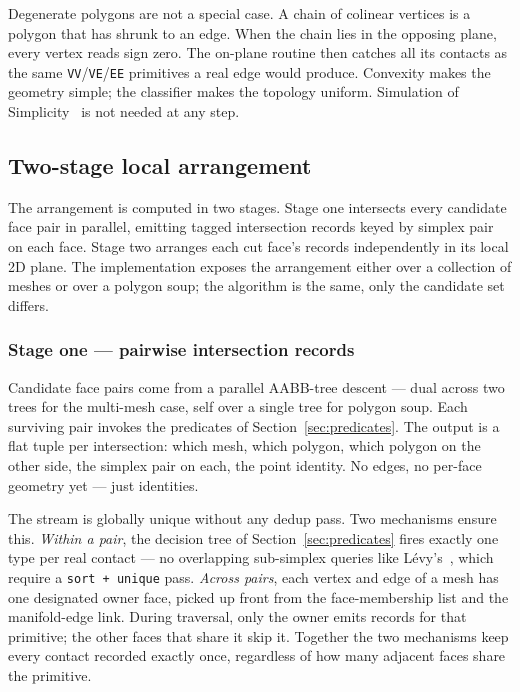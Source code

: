 \documentclass{egpubl}
\begin{document}
Degenerate polygons are not a special case. A chain of colinear vertices is a polygon that has shrunk to an edge. When the chain lies in the opposing plane, every vertex reads sign zero. The on-plane routine then catches all its contacts as the same \texttt{VV}/\texttt{VE}/\texttt{EE} primitives a real edge would produce. Convexity makes the geometry simple; the classifier makes the topology uniform. Simulation of Simplicity~\cite{EdelsbrunnerMucke1990} is not needed at any step.

\subsection{Two-stage local arrangement}
\label{sec:arrangement}

The arrangement is computed in two stages. Stage one intersects every candidate face pair in parallel, emitting tagged intersection records keyed by simplex pair on each face. Stage two arranges each cut face's records independently in its local 2D plane. The implementation exposes the arrangement either over a collection of meshes or over a polygon soup; the algorithm is the same, only the candidate set differs.

\subsubsection*{Stage one --- pairwise intersection records}

Candidate face pairs come from a parallel AABB-tree descent --- dual across two trees for the multi-mesh case, self over a single tree for polygon soup. Each surviving pair invokes the predicates of Section~\ref{sec:predicates}. The output is a flat tuple per intersection: which mesh, which polygon, which polygon on the other side, the simplex pair on each, the point identity. No edges, no per-face geometry yet --- just identities.

The stream is globally unique without any dedup pass. Two mechanisms ensure this. \emph{Within a pair}, the decision tree of Section~\ref{sec:predicates} fires exactly one type per real contact --- no overlapping sub-simplex queries like L\'evy's~\cite{Levy2025}, which require a \texttt{sort + unique} pass. \emph{Across pairs}, each vertex and edge of a mesh has one designated owner face, picked up front from the face-membership list and the manifold-edge link. During traversal, only the owner emits records for that primitive; the other faces that share it skip it. Together the two mechanisms keep every contact recorded exactly once, regardless of how many adjacent faces share the primitive.
\end{document}
